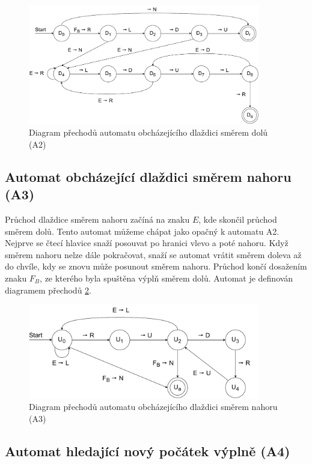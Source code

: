 \begin{figure}[H]
    \centering
    \includegraphics[width=0.9\textwidth]{obrazky-figures/PoBunceDolu.pdf}
    \caption{Diagram přechodů automatu obcházejícího dlaždici směrem dolů (A2)}
    \label{fig:PoDlazdiciDolu}
\end{figure}

\subsection*{Automat obcházející dlaždici směrem nahoru (A3)}
\label{secA3}

Průchod dlaždice směrem nahoru začíná na znaku $E$, kde skončil průchod směrem dolů. Tento automat můžeme chápat jako opačný k automatu A2. Nejprve se čtecí hlavice snaží posouvat po hranici vlevo a poté nahoru. Když směrem nahoru nelze dále pokračovat, snaží se automat vrátit směrem doleva až do chvíle, kdy se znovu může posunout směrem nahoru. Průchod končí dosažením znaku $F_B$, ze kterého byla spuštěna výplň směrem dolů. Automat je definován diagramem přechodů \ref{fig:PoDlazdiciNahoru}.

\begin{figure}[H]
    \centering
    \includegraphics[width=0.9\textwidth]{obrazky-figures/PoBunceNahoru.pdf}
    \caption{Diagram přechodů automatu obcházejícího dlaždici směrem nahoru (A3)}
    \label{fig:PoDlazdiciNahoru}
\end{figure}
\subsection*{Automat hledající nový počátek výplně (A4)}
\label{secA4}

